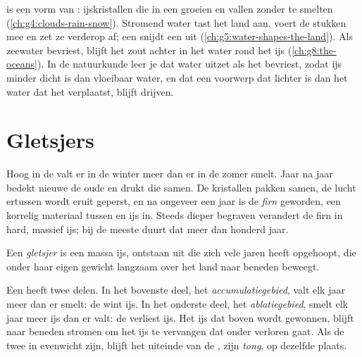 \begin{recall}
 is een vorm van : ijskristallen die in een  groeien en
vallen zonder te smelten (\cref{ch:g4:clouds-rain-snow}). Stromend water
tast het land aan, voert de stukken mee en zet ze verderop af; een 
snijdt een  uit (\cref{ch:g5:water-shapes-the-land}). Als zeewater
bevriest, blijft het zout achter in het water rond het ijs
(\cref{ch:g8:the-oceans}). In de natuurkunde leer je dat water uitzet als
het bevriest, zodat ijs minder dicht is dan vloeibaar water, en dat een
voorwerp dat lichter is dan het water dat het verplaatst, blijft drijven.
\end{recall}

\section{Gletsjers}

Hoog in de  valt er in de winter meer  dan er in de zomer
smelt. Jaar na jaar bedekt nieuwe  de oude  en drukt die
samen. De kristallen pakken samen, de lucht ertussen wordt eruit geperst,
en na ongeveer een jaar is de  \emph{firn} geworden, een korrelig
materiaal tussen  en ijs in. Steeds dieper begraven verandert de
firn in hard, massief ijs; bij de meeste  duurt dat meer dan
honderd jaar.

\begin{definition}[Gletsjer]\label{def:g8:ice-on-earth:glacier}
Een \emph{gletsjer} is een massa ijs, ontstaan uit 
die zich vele jaren heeft opgehoopt, die onder haar eigen gewicht langzaam
over het land naar beneden beweegt.
\end{definition}

Een  heeft twee delen. In het bovenste deel, het
\emph{accumulatiegebied}, valt elk jaar meer  dan er smelt: de
 wint ijs. In het onderste deel, het \emph{ablatiegebied}, smelt
elk jaar meer ijs dan er  valt: de  verliest ijs. Het ijs dat
boven wordt gewonnen, blijft naar beneden stromen om het ijs te vervangen
dat onder verloren gaat. Als de twee in evenwicht zijn, blijft het
uiteinde van de , zijn \emph{tong}, op dezelfde plaats.

